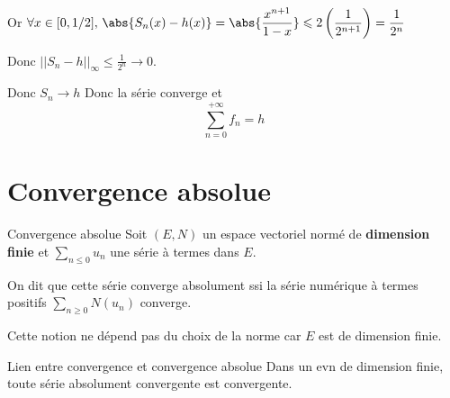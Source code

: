 Or $\displaystyle \forall x \in [0, 1 / 2], \, \abs{S_n(x) - h(x)} = \abs{\frac{x^{n + 1}}{1 - x}} \leqslant 2 \left( \frac 1 {2^{n + 1}} \right) = \frac 1 {2^n}$

Donc $|| S_n - h ||_\infty \leqslant \frac 1 {2^n} \longrightarrow 0$.

Donc $S_n \longrightarrow h$ Donc la série converge et 
$$\sum_{n = 0}^{+\infty} f_n = h$$


\section{Convergence absolue }

\begin{definition}{Convergence absolue}{}
    Soit $(E, N)$ un espace vectoriel normé de \textbf{dimension finie} et $\sum_{n \leqslant 0} u_n$
    une série à termes dans $E$. 

    On dit que cette série converge absolument ssi la série numérique à termes positifs 
    $\sum_{n \geqslant 0} N(u_n)$ converge. 
\end{definition}


\begin{remarque}
    Cette notion ne dépend pas du choix de la norme car $E$ est de dimension finie.
\end{remarque}


\begin{theoreme}{Lien entre convergence et convergence absolue}{}
    Dans un evn de dimension finie, toute série absolument convergente est convergente.
\end{theoreme}


